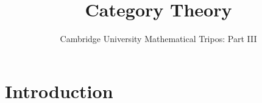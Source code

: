\documentclass{article}
\title{Category Theory}
\author{Cambridge University Mathematical Tripos: Part III}
\begin{document}
\maketitle

\tableofcontentsnewpage{}

\section{Introduction}

\end{document}
